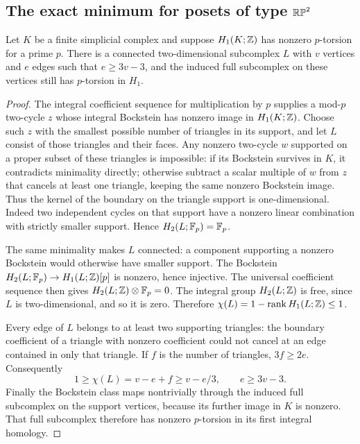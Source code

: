 \subsection{The exact minimum for posets of type $\mathbb {RP}^2$}
\begin{lemma}\label{lem:C-torsion-support}
Let $K$ be a finite simplicial complex and suppose
$H_1(K;\mathbb Z)$ has nonzero $p$-torsion for a prime $p$.
There is a connected two-dimensional subcomplex $L$ with
$v$ vertices and $e$ edges such that $e\ge3v-3$, and the induced
full subcomplex on these vertices still has $p$-torsion in $H_1$.
\end{lemma}
\begin{proof}
The integral coefficient sequence for multiplication by $p$ supplies a
mod-$p$ two-cycle $z$ whose integral Bockstein has nonzero image in
$H_1(K;\mathbb Z)$. Choose such $z$ with the smallest possible number of
triangles in its support, and let $L$ consist of those triangles and
their faces. Any nonzero two-cycle $w$ supported on a proper subset
of these triangles is impossible: if its Bockstein survives in $K$,
it contradicts minimality directly; otherwise subtract a scalar
multiple of $w$ from $z$ that cancels at least one triangle, keeping
the same nonzero Bockstein image. Thus the kernel of the boundary
on the triangle support is one-dimensional. Indeed two independent
cycles on that support have a nonzero linear combination with strictly
smaller support. Hence $H_2(L;\mathbb F_p)=\mathbb F_p$.

The same minimality makes $L$ connected: a component supporting a
nonzero Bockstein would otherwise have smaller support. The Bockstein
$H_2(L;\mathbb F_p)\to H_1(L;\mathbb Z)[p]$ is nonzero, hence injective.
The universal coefficient sequence then gives
$H_2(L;\mathbb Z)\otimes\mathbb F_p=0$. The integral group $H_2(L;\mathbb Z)$ is
free, since $L$ is two-dimensional, and so it is zero. Therefore
$\chi(L)=1-\operatorname{rank}H_1(L;\mathbb Z)\le1$.

Every edge of $L$ belongs to at least two supporting triangles: the
boundary coefficient of a triangle with nonzero coefficient could not
cancel at an edge contained in only that triangle. If $f$ is the
number of triangles, $3f\ge2e$. Consequently
\[
 1\ge\chi(L)=v-e+f\ge v-e/3,
 \qquad e\ge3v-3.
\]
Finally the Bockstein class maps nontrivially through the induced full
subcomplex on the support vertices, because its further image in $K$
is nonzero. That full subcomplex therefore has nonzero $p$-torsion in
its first integral homology.
\end{proof}

